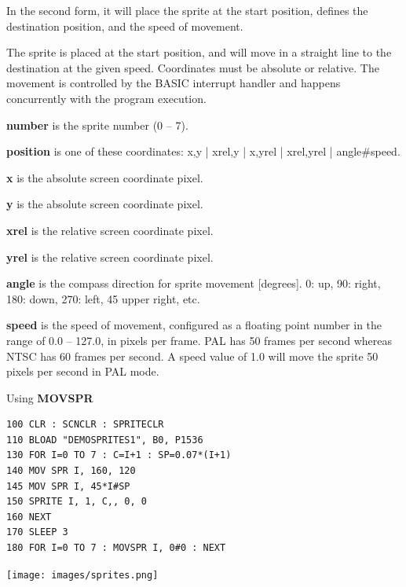 \begin{description}[leftmargin=2cm,style=nextline]
                  In the second form, it will place the sprite at the start position, defines the destination position, and the speed of movement.

                  The sprite is placed at the start position, and will move in a straight line to the destination at the given speed. Coordinates must be absolute or relative. The movement is controlled by the BASIC interrupt handler and happens concurrently with the program execution.

                  {\bf number} is the sprite number (0 -- 7).

                  {\bf position} is one of these coordinates: x,y | xrel,y | x,yrel | xrel,yrel | angle\#speed.

                  {\bf x} is the absolute screen coordinate pixel.

                  {\bf y} is the absolute screen coordinate pixel.

                  {\bf xrel} is the relative screen coordinate pixel.

                  {\bf yrel} is the relative screen coordinate pixel.

                  {\bf angle} is the compass direction for sprite movement [degrees]. 0: up, 90: right, 180: down, 270: left, 45 upper right, etc.

                  {\bf speed} is the speed of movement, configured as a floating point number in the range of 0.0 -- 127.0, in pixels per frame. PAL has 50 frames per second whereas NTSC has 60 frames per second. A speed value of 1.0 will move the sprite 50 pixels per second in PAL mode.

\item [Example:]  Using {\bf MOVSPR}

\begin{tcolorbox}[colback=black,coltext=white]
\verbatimfont{\codefont}
\begin{verbatim}
100 CLR : SCNCLR : SPRITECLR
110 BLOAD "DEMOSPRITES1", B0, P1536
130 FOR I=0 TO 7 : C=I+1 : SP=0.07*(I+1)
140 MOV SPR I, 160, 120
145 MOV SPR I, 45*I#SP
150 SPRITE I, 1, C,, 0, 0
160 NEXT
170 SLEEP 3
180 FOR I=0 TO 7 : MOVSPR I, 0#0 : NEXT
\end{verbatim}
\end{tcolorbox}

\item \begin{center}\texttt{[image: images/sprites.png]}\end{center}

\end{description}

